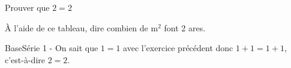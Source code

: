 \begin{exercice*}
    \partie
    Prouver que $2=2$

    \partie
    À l'aide de ce tableau, dire combien de $\text{m}^2$ font 2 ares.
\end{exercice*}
\begin{corrige}
    \partie
    BaseSérie 1 - On sait que $1=1$ avec l’exercice précédent donc $1+1=1+1$,
    c’est-à-dire $2=2$.

    \partie
\end{corrige}
